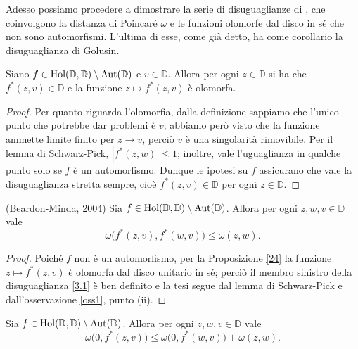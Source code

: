 Adesso possiamo procedere a dimostrare la serie di disuguaglianze di \cite{BM}, che coinvolgono la distanza di Poincaré $\omega$ e le funzioni olomorfe dal disco in sé che non sono automorfismi. L'ultima di esse, come già detto, ha come corollario la disuguaglianza di Golusin.

\begin{prop} \label{24}
  Siano $f \in \text{\normalfont{Hol}}(\mathbb{D},\mathbb{D})\setminus\text{\normalfont{Aut}}(\mathbb{D})$ e $v \in \mathbb{D}$. Allora per ogni $z \in \mathbb{D}$ si ha che $f^*(z,v) \in \mathbb{D}$ e la funzione $z \longmapsto f^*(z,v)$ è olomorfa.
\end{prop}

\begin{proof}
  Per quanto riguarda l'olomorfia, dalla definizione sappiamo che l'unico punto che potrebbe dar problemi è $v$; abbiamo però visto che la funzione ammette limite finito per $z \longrightarrow v$, perciò $v$ è una singolarità rimovibile. Per il lemma di Schwarz-Pick, $|f^*(z,w)| \le 1$; inoltre, vale l'uguaglianza in qualche punto solo se $f$ è un automorfismo. Dunque le ipotesi su $f$ assicurano che vale la disuguaglianza stretta sempre, cioè $f^*(z,v) \in \mathbb{D}$ per ogni $z \in \mathbb{D}$.
\end{proof}

\begin{thm} \label{31}
  (Beardon-Minda, 2004) Sia $f \in \text{\normalfont{Hol}}(\mathbb{D},\mathbb{D})\setminus\text{\normalfont{Aut}}(\mathbb{D})$. Allora per ogni $z, w, v \in \mathbb{D}$ vale
  \begin{equation} \label{3.1}
    \omega\bigl(f^*(z,v),f^*(w,v)\bigr) \le \omega(z,w).
  \end{equation}
\end{thm}

\begin{proof}
  Poiché $f$ non è un automorfismo, per la Proposizione \ref{24} la funzione $z \longmapsto f^*(z,v)$ è olomorfa dal disco unitario in sé; perciò il membro sinistro della disuguaglianza \eqref{3.1} è ben definito e la tesi segue dal lemma di Schwarz-Pick e dall'osservazione \ref{oss1}, punto (ii).
\end{proof}

\begin{cor} \label{32}
  Sia $f \in \text{\normalfont{Hol}}(\mathbb{D},\mathbb{D})\setminus\text{\normalfont{Aut}}(\mathbb{D})$. Allora per ogni $z, w, v \in \mathbb{D}$ vale
  \begin{equation}
    \omega\bigl(0, f^*(z,v)\bigr) \le \omega\bigl(0,f^*(w,v)\bigr)+\omega(z,w).
  \end{equation}
\end{cor}

